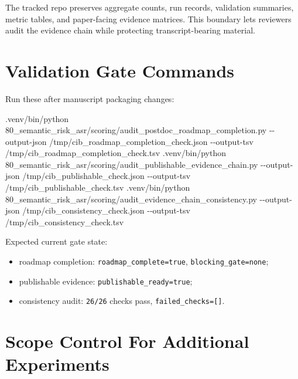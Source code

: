 \documentclass[
]{article}
\newenvironment{Shaded}{}{}
\newcommand{\AttributeTok}[1]{\textcolor[rgb]{0.49,0.56,0.16}{#1}}
\newcommand{\ExtensionTok}[1]{#1}
\newcommand{\NormalTok}[1]{#1}
\providecommand{\tightlist}{%
  \setlength{\itemsep}{0pt}\setlength{\parskip}{0pt}}
\begin{document}
The tracked repo preserves aggregate counts, run records, validation
summaries, metric tables, and paper-facing evidence matrices. This
boundary lets reviewers audit the evidence chain while protecting
transcript-bearing material.

\hypertarget{validation-gate-commands}{%
\section{Validation Gate Commands}\label{validation-gate-commands}}

Run these after manuscript packaging changes:

\begin{Shaded}
\begin{Highlighting}[]
\ExtensionTok{.venv/bin/python}\NormalTok{ 80\_semantic\_risk\_asr/scoring/audit\_postdoc\_roadmap\_completion.py }\AttributeTok{{-}{-}output{-}json}\NormalTok{ /tmp/cib\_roadmap\_completion\_check.json }\AttributeTok{{-}{-}output{-}tsv}\NormalTok{ /tmp/cib\_roadmap\_completion\_check.tsv}
\ExtensionTok{.venv/bin/python}\NormalTok{ 80\_semantic\_risk\_asr/scoring/audit\_publishable\_evidence\_chain.py }\AttributeTok{{-}{-}output{-}json}\NormalTok{ /tmp/cib\_publishable\_check.json }\AttributeTok{{-}{-}output{-}tsv}\NormalTok{ /tmp/cib\_publishable\_check.tsv}
\ExtensionTok{.venv/bin/python}\NormalTok{ 80\_semantic\_risk\_asr/scoring/audit\_evidence\_chain\_consistency.py }\AttributeTok{{-}{-}output{-}json}\NormalTok{ /tmp/cib\_consistency\_check.json }\AttributeTok{{-}{-}output{-}tsv}\NormalTok{ /tmp/cib\_consistency\_check.tsv}
\end{Highlighting}
\end{Shaded}

Expected current gate state:

\begin{itemize}
\tightlist
\item
  roadmap completion: \texttt{roadmap\_complete=true},
  \texttt{blocking\_gate=none};
\item
  publishable evidence: \texttt{publishable\_ready=true};
\item
  consistency audit: \texttt{26/26} checks pass,
  \texttt{failed\_checks={[}{]}}.
\end{itemize}

\hypertarget{scope-control-for-additional-experiments}{%
\section{Scope Control For Additional
Experiments}\label{scope-control-for-additional-experiments}}
\end{document}
